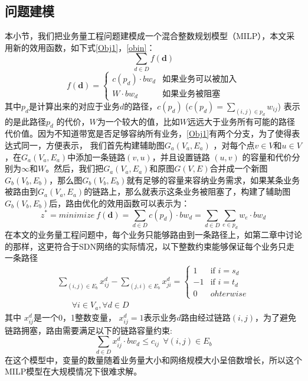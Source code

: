 \subsection{问题建模}
本小节，我们把业务量工程问题建模成一个混合整数规划模型（MILP），本文采用新的效用函数，如下式\ref{Obj1}，\ref{obin}：
\begin{equation}\label{Obj1}
\sum\limits_{d \in D} f(\mathbf{d})
\end{equation}
\begin{equation}\label{obin}
f(\mathbf{d})=\begin{cases}
c(p_d) \cdot bw_{d} & \text{如果业务可以被加入}\\
W \cdot bw_{d}& \text{如果业务被阻塞}
\end{cases}
\end{equation}
其中$p_d$是计算出来的对应于业务$d$的路径，$c(p_d)$ ($c(p_d) = \sum_{(i,j)\in p_d} w_{ij}$) 表示的是此路径$p_d$ 的代价，$W$为一个较大的值，比如$W$远远大于业务所有可能的路径代价值。因为不知道带宽是否足够容纳所有业务，\ref{Obj1}有两个分支，为了使得表达式同一，方便表示，
我们首先构建辅助图$G_a(V_a, E_a)$ ，对每个点$v \in V$和$u \in V$，在$G_a(V_a,E_a)$中添加一条链路$(v,u)$，并且设置链路 $(u,v)$ 的容量和代价分别为$\infty$和$W$。然后，我们把$G_a(V_a,E_a)$和原图$G(V,E)$合并成一个新图$G_b(V_b,E_b)$，那么图$G_b(V_b,E_b)$就有足够的容量来容纳业务需求，如果某条业务被路由到$G_a(V_a, E_a)$的链路上，那么就表示这条业务被阻塞了，构建了辅助图$G_b(V_b, E_b)$后，路由优化的效用函数可以表示为：
\begin{equation}\label{Obj2}
z^* = minimize~f(\mathbf{d})=
\sum\limits_{d \in D} c(p_d)\cdot bw_d= \sum\limits_{d \in D}\sum\limits_{e \in p_d} w_e \cdot bw_d
\end{equation}
在本文的业务量工程问题中，每个业务只能够路由到一条路径上，如第二章中讨论的那样，这更符合于SDN网络的实际情况，以下整数约束能够保证每个业务只走一条路径
\begin{equation}\label{FlowConv}
\begin{split}
\sum\limits_{(i,j) \in E_b} x_{ij}^d - \sum\limits_{(j,i) \in E_b} x_{ji}^d
=\begin{cases}
1 & \text{if $i = s_d$}\\
-1 & \text{if $i = t_d$} \\
0 &{ohterwise}
\end{cases}
\\~~~~~~~~\forall i\in V_a, \forall d\in D
\end{split}
\end{equation}
其中 $x_{ij}^d$是一个0，1整数变量， $x_{ij}^d=1$表示业务$d$路由经过链路$(i,j)$，为了避免链路拥塞，路由需要满足以下的链路容量约束:
\begin{equation}\label{Capcon}
\sum\limits_{d \in D}x_{ij}^d \cdot bw_d \le c_{ij} ~~\forall (i,j)\in E_b
\end{equation}
在这个模型中，变量的数量随着业务量大小和网络规模大小呈倍数增长，所以这个MILP模型在大规模情况下很难求解。
